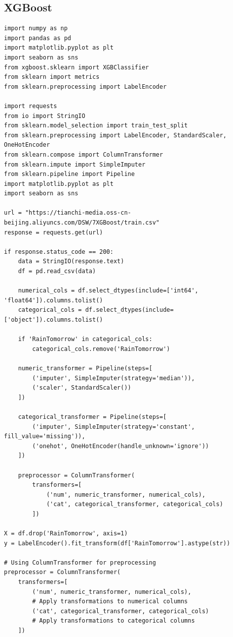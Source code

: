 \documentclass[12pt]{article}
\begin{document}
\subsection*{XGBoost}
\begin{verbatim}
import numpy as np 
import pandas as pd
import matplotlib.pyplot as plt
import seaborn as sns
from xgboost.sklearn import XGBClassifier
from sklearn import metrics
from sklearn.preprocessing import LabelEncoder

import requests
from io import StringIO
from sklearn.model_selection import train_test_split
from sklearn.preprocessing import LabelEncoder, StandardScaler, OneHotEncoder
from sklearn.compose import ColumnTransformer
from sklearn.impute import SimpleImputer
from sklearn.pipeline import Pipeline
import matplotlib.pyplot as plt
import seaborn as sns

url = "https://tianchi-media.oss-cn-beijing.aliyuncs.com/DSW/7XGBoost/train.csv"
response = requests.get(url)

if response.status_code == 200:
    data = StringIO(response.text)
    df = pd.read_csv(data)
    
    numerical_cols = df.select_dtypes(include=['int64', 'float64']).columns.tolist()
    categorical_cols = df.select_dtypes(include=['object']).columns.tolist()
  
    if 'RainTomorrow' in categorical_cols:
        categorical_cols.remove('RainTomorrow')

    numeric_transformer = Pipeline(steps=[
        ('imputer', SimpleImputer(strategy='median')),
        ('scaler', StandardScaler())
    ])

    categorical_transformer = Pipeline(steps=[
        ('imputer', SimpleImputer(strategy='constant', fill_value='missing')),
        ('onehot', OneHotEncoder(handle_unknown='ignore'))
    ])

    preprocessor = ColumnTransformer(
        transformers=[
            ('num', numeric_transformer, numerical_cols),
            ('cat', categorical_transformer, categorical_cols)
        ])
    
X = df.drop('RainTomorrow', axis=1)
y = LabelEncoder().fit_transform(df['RainTomorrow'].astype(str))

# Using ColumnTransformer for preprocessing
preprocessor = ColumnTransformer(
    transformers=[
        ('num', numeric_transformer, numerical_cols), 
        # Apply transformations to numerical columns
        ('cat', categorical_transformer, categorical_cols)  
        # Apply transformations to categorical columns
    ])


\end{verbatim}
\end{document}
